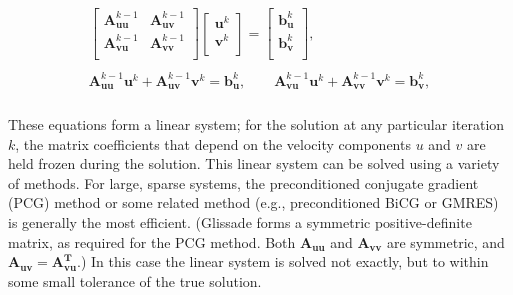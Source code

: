 \begin{align*}
\begin{matrix}
  \left[ \begin{matrix}
   \mathbf{A}_{\mathbf{uu}}^{k-1} & \mathbf{A}_{\mathbf{uv}}^{k-1}  \\
   \mathbf{A}_{\mathbf{vu}}^{k-1} & \mathbf{A}_{\mathbf{vv}}^{k-1}  \\
\end{matrix} \right]\left[ \begin{matrix}
   \mathbf{u}^{k}  \\
   \mathbf{v}^{k}  \\
\end{matrix} \right]=\left[ \begin{matrix}
   \mathbf{b}_{\mathbf{u}}^{k}  \\
   \mathbf{b}_{\mathbf{v}}^{k}  \\
\end{matrix} \right], \\ 
   \\ 
  \mathbf{A}_{\mathbf{uu}}^{k-1}\mathbf{u}^{k} + \mathbf{A}_{\mathbf{uv}}^{k-1}\mathbf{v}^{k} =\mathbf{b}_{\mathbf{u}}^{k},
  \quad \quad \mathbf{A}_{\mathbf{vu}}^{k-1}\mathbf{u}^{k} + \mathbf{A}_{\mathbf{vv}}^{k-1}\mathbf{v}^{k} =\mathbf{b}_{\mathbf{v}}^{k}, \\ 
\end{matrix}
\end{align*}

\noindent
These equations form a linear system; for the solution at any particular iteration $k$, 
the matrix coefficients that depend on the velocity components $u$ and $v$ are held frozen during the solution.
This linear system can be solved using a variety of methods. For large, sparse systems, the preconditioned conjugate gradient (PCG) method 
or some related method (e.g., preconditioned BiCG or GMRES) is generally the most efficient. 
(Glissade forms a symmetric positive-definite matrix, as required for the PCG method.
Both $\mathbf{A_{uu}}$ and $\mathbf{A_{vv}}$ are symmetric, and $\mathbf{A_{uv}} = \mathbf{A_{vu}^T}$.) 
In this case the linear system is solved not exactly, but to within some small tolerance of the true solution.

